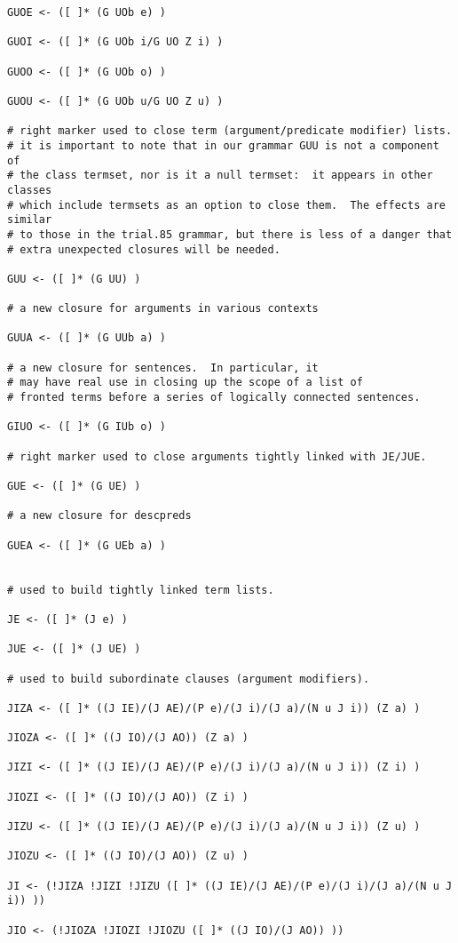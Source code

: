 \documentclass{article}
\begin{document}
\begin{verbatim}
GUOE <- ([ ]* (G UOb e) )

GUOI <- ([ ]* (G UOb i/G UO Z i) )

GUOO <- ([ ]* (G UOb o) )

GUOU <- ([ ]* (G UOb u/G UO Z u) )

# right marker used to close term (argument/predicate modifier) lists.
# it is important to note that in our grammar GUU is not a component of
# the class termset, nor is it a null termset:  it appears in other classes
# which include termsets as an option to close them.  The effects are similar
# to those in the trial.85 grammar, but there is less of a danger that
# extra unexpected closures will be needed.

GUU <- ([ ]* (G UU) )

# a new closure for arguments in various contexts

GUUA <- ([ ]* (G UUb a) )

# a new closure for sentences.  In particular, it
# may have real use in closing up the scope of a list of
# fronted terms before a series of logically connected sentences.

GIUO <- ([ ]* (G IUb o) )

# right marker used to close arguments tightly linked with JE/JUE.

GUE <- ([ ]* (G UE) )

# a new closure for descpreds

GUEA <- ([ ]* (G UEb a) )


# used to build tightly linked term lists.

JE <- ([ ]* (J e) )

JUE <- ([ ]* (J UE) )

# used to build subordinate clauses (argument modifiers).

JIZA <- ([ ]* ((J IE)/(J AE)/(P e)/(J i)/(J a)/(N u J i)) (Z a) )

JIOZA <- ([ ]* ((J IO)/(J AO)) (Z a) )

JIZI <- ([ ]* ((J IE)/(J AE)/(P e)/(J i)/(J a)/(N u J i)) (Z i) )

JIOZI <- ([ ]* ((J IO)/(J AO)) (Z i) )

JIZU <- ([ ]* ((J IE)/(J AE)/(P e)/(J i)/(J a)/(N u J i)) (Z u) )

JIOZU <- ([ ]* ((J IO)/(J AO)) (Z u) )

JI <- (!JIZA !JIZI !JIZU ([ ]* ((J IE)/(J AE)/(P e)/(J i)/(J a)/(N u J i)) ))

JIO <- (!JIOZA !JIOZI !JIOZU ([ ]* ((J IO)/(J AO)) ))


\end{verbatim}
\end{document}
